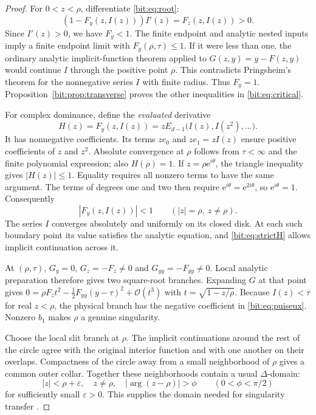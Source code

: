 \documentclass[11pt]{article}
\theoremstyle{definition}\newtheorem{definition}[theorem]{Definition}
\theoremstyle{remark}\newtheorem{remark}[theorem]{Remark}
\newcommand{\bigO}{\mathcal O}
\newcommand{\ee}{\mathrm e}
\begin{document}
\begin{proof}
For $0<z<\rho$, differentiate \eqref{bit:eq:root}:
\begin{equation}
 (1-F_y(z,I(z)))I'(z)=F_z(z,I(z))>0.
 \label{bit:eq:branch}
\end{equation}
Since $I'(z)>0$, we have $F_y<1$. The finite endpoint and analytic nested inputs imply a finite endpoint limit with $F_y(\rho,\tau)\le1$. If it were less than one, the ordinary analytic implicit-function theorem applied to $G(z,y)=y-F(z,y)$ would continue $I$ through the positive point $\rho$. This contradicts Pringsheim's theorem for the nonnegative series $I$ with finite radius. Thus $F_y=1$. Proposition~\ref{bit:prop:transverse} proves the other inequalities in \eqref{bit:eq:critical}.

For complex dominance, define the \emph{evaluated} derivative
\begin{equation}
 H(z)=F_y(z,I(z))=zE_{d-1}\bigl(I(z),I(z^2),\ldots\bigr).
 \label{bit:eq:H}
\end{equation}
It has nonnegative coefficients. Its terms $z e_0$ and $z e_1=zI(z)$ ensure positive coefficients of $z$ and $z^2$. Absolute convergence at $\rho$ follows from $\tau<\infty$ and the finite polynomial expression; also $H(\rho)=1$.
If $z=\rho\ee^{i\theta}$, the triangle inequality gives $|H(z)|\le1$. Equality requires all nonzero terms to have the same argument. The terms of degrees one and two then require $\ee^{i\theta}=\ee^{2i\theta}$, so $\ee^{i\theta}=1$. Consequently
\begin{equation}
 |F_y(z,I(z))|<1\qquad (|z|=\rho,\ z\ne\rho).
 \label{bit:eq:strictH}
\end{equation}
The series $I$ converges absolutely and uniformly on its closed disk. At each such boundary point its value satisfies the analytic equation, and \eqref{bit:eq:strictH} allows implicit continuation across it.

At $(\rho,\tau)$, $G_y=0$, $G_z=-F_z\ne0$ and $G_{yy}=-F_{yy}\ne0$. Local analytic preparation therefore gives two square-root branches. Expanding $G$ at that point gives
$0=\rho F_z t^2-\tfrac12F_{yy}(y-\tau)^2+\bigO(t^3)$ with $t=\sqrt{1-z/\rho}$.
Because $I(z)<\tau$ for real $z<\rho$, the physical branch has the negative coefficient in \eqref{bit:eq:puiseux}. Nonzero $b_1$ makes $\rho$ a genuine singularity.

Choose the local slit branch at $\rho$. The implicit continuations around the rest of the circle agree with the original interior function and with one another on their overlaps. Compactness of the circle away from a small neighborhood of $\rho$ gives a common outer collar. Together these neighborhoods contain a usual $\Delta$-domain:
\begin{equation}
 |z|<\rho+\varepsilon,\quad z\ne\rho,\quad
 |\arg(z-\rho)|>\phi
 \qquad (0<\phi<\pi/2)
 \label{bit:eq:delta}
\end{equation}
for sufficiently small $\varepsilon>0$. This supplies the domain needed for singularity transfer \cite[Chs.~VI--VII]{fs}.
\end{proof}
\end{document}
